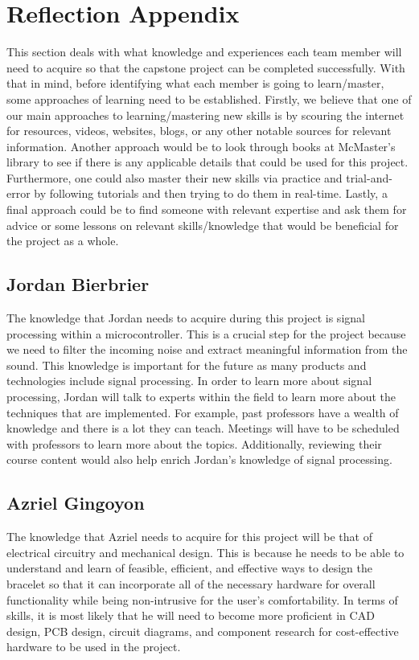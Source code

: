 \documentclass[12pt]{article}
\begin{document}
\section*{Reflection Appendix}
This section deals with what knowledge and experiences each team member will need 
to acquire so that the capstone project can be completed successfully. With that in 
mind, before identifying what each member is going to learn/master, some approaches 
of learning need to be established. Firstly, we believe that one of our main approaches 
to learning/mastering new skills is by scouring the internet for resources, videos, websites, 
blogs, or any other notable sources for relevant information. Another approach would be to 
look through books at McMaster's library to see if there is any applicable details that could 
be used for this project. Furthermore, one could also master their new skills via practice 
and trial-and-error by following tutorials and then trying to do them in real-time. Lastly, a 
final approach could be to find someone with relevant expertise and ask them for advice or 
some lessons on relevant skills/knowledge that would be beneficial for the project as a whole.

\subsection*{Jordan Bierbrier}
The knowledge that Jordan needs to acquire during this project is signal processing within a microcontroller. This is a crucial step for the project because we need to filter the incoming noise and extract meaningful information from the sound. This knowledge is important for the future as many products and technologies include signal processing. In order to learn more about signal processing, Jordan will talk to experts within the field to learn more about the techniques that are implemented. For example, past professors have a wealth of knowledge and there is a lot they can teach. Meetings will have to be scheduled with professors to learn more about the topics. Additionally, reviewing their course content would also help enrich Jordan’s knowledge of signal processing.   \\

\subsection*{Azriel Gingoyon}
The knowledge that Azriel needs to acquire for this project will be that of electrical 
circuitry and mechanical design. This is because he needs to be able to understand and 
learn of feasible, efficient, and effective ways to design the bracelet so that it can 
incorporate all of the necessary hardware for overall functionality while being non-intrusive 
for the user's comfortability. In terms of skills, it is most likely that he will need to 
become more proficient in CAD design, PCB design, circuit diagrams, and component research for 
cost-effective hardware to be used in the project.
\newline
\end{document}
